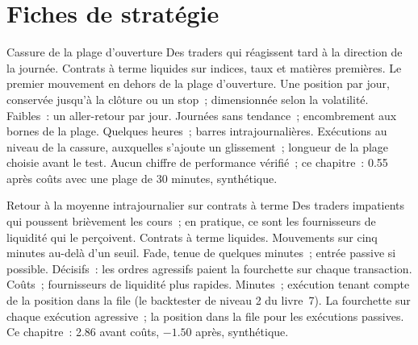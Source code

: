 \section{Fiches de stratégie}

\begin{strategyfile}{Cassure de la plage d'ouverture}\label{strat:s1:short-term-futures-strategies:orb}
 Des traders qui réagissent tard à la direction de la journée.
 Contrats à terme liquides sur indices, taux et matières premières.
 Le premier mouvement en dehors de la plage d'ouverture.
 Une position par jour, conservée jusqu'à la clôture ou un stop~; dimensionnée selon la volatilité.
 Faibles~: un aller-retour par jour.
 Journées sans tendance~; encombrement aux bornes de la plage.
 Quelques heures~; barres intrajournalières.
 Exécutions au niveau de la cassure, auxquelles s'ajoute un glissement~; longueur de la plage choisie avant le test.
 Aucun chiffre de performance vérifié~; ce chapitre~: 0.55 après coûts avec une plage de 30 minutes, synthétique.
\end{strategyfile}

\begin{strategyfile}{Retour à la moyenne intrajournalier sur contrats à terme}\label{strat:s1:short-term-futures-strategies:mr}
 Des traders impatients qui poussent brièvement les cours~; en pratique, ce sont les fournisseurs de liquidité qui le perçoivent.
 Contrats à terme liquides.
 Mouvements sur cinq minutes au-delà d'un seuil.
 Fade, tenue de quelques minutes~; entrée passive si possible.
 Décisifs~: les ordres agressifs paient la fourchette sur chaque transaction.
 Coûts~; fournisseurs de liquidité plus rapides.
 Minutes~; exécution tenant compte de la position dans la file (le backtester de niveau 2 du livre~7).
 La fourchette sur chaque exécution agressive~; la position dans la file pour les exécutions passives.
 Ce chapitre~: 2.86 avant coûts, $-1.50$ après, synthétique.
\end{strategyfile}

